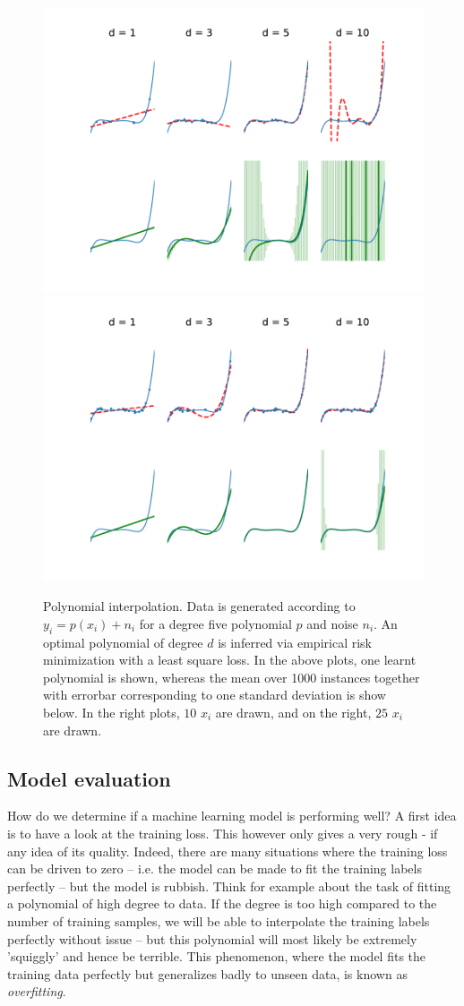 \documentclass{article}
\begin{document}
\begin{figure}
    \centering
    \includegraphics[width=0.45\linewidth]{graphics/poly_fit.pdf}\includegraphics[width=0.45\linewidth]{graphics/poly_fit_large_n.pdf}
    \caption{Polynomial interpolation. Data is generated according to $y_i = p(x_i)+n_i$ for a degree five polynomial $p$ and noise $n_i$. An optimal polynomial of degree $d$ is inferred via empirical risk minimization with a least square loss. In the above plots, one learnt polynomial is shown, whereas the mean over 1000 instances together with errorbar corresponding to one standard deviation is show below. In the right plots, $10$ $x_i$ are drawn, and on the right, $25$ $x_i$ are drawn.}
    \label{fig:poly}
\end{figure}


\subsection{Model evaluation}
How do we determine if a machine learning model is performing well? A first idea is to have a look at the training loss. This however only gives a very rough - if any idea of its quality. Indeed, there are many situations where the training loss can be driven to zero -- i.e. the model can be made to fit the training labels perfectly -- but the model is rubbish. Think for example about the task of fitting a polynomial of high degree to data. If the degree is too high compared to the number of training samples, we will be able to interpolate the training labels perfectly without issue -- but this polynomial will most likely be extremely 'squiggly' and hence be terrible. This phenomenon, where the model fits the training data perfectly but generalizes badly to unseen data, is known as \emph{overfitting}.
\end{document}
